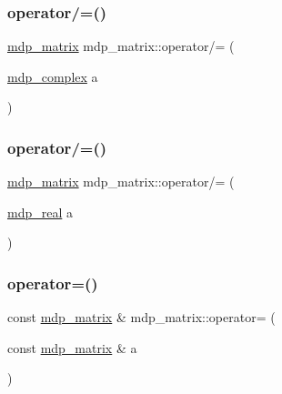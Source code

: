 \mbox{\label{classmdp__matrix_aab26bb8bce6bb9f9207e2776297c1f8d}} 
\subsubsection{\texorpdfstring{operator/=()}{operator/=()}\hspace{0.1cm}{\footnotesize\ttfamily [2/3]}}
{\footnotesize\ttfamily \hyperlink{classmdp__matrix}{mdp\+\_\+matrix} mdp\+\_\+matrix\+::operator/= (\begin{DoxyParamCaption}\item[{\hyperlink{classmdp__complex}{mdp\+\_\+complex}}]{a }\end{DoxyParamCaption})\hspace{0.3cm}{\ttfamily [inline]}}

\mbox{\label{classmdp__matrix_abc83a95f12ed5f697213cf9d812a99cd}} 
\subsubsection{\texorpdfstring{operator/=()}{operator/=()}\hspace{0.1cm}{\footnotesize\ttfamily [3/3]}}
{\footnotesize\ttfamily \hyperlink{classmdp__matrix}{mdp\+\_\+matrix} mdp\+\_\+matrix\+::operator/= (\begin{DoxyParamCaption}\item[{\hyperlink{mdp__global__vars_8h_a69d96b74c791e0bbdb888b3913a69450}{mdp\+\_\+real}}]{a }\end{DoxyParamCaption})\hspace{0.3cm}{\ttfamily [inline]}}

\mbox{\label{classmdp__matrix_a5746a4a6feeaca44c8c9a02bd21e9d57}} 
\subsubsection{\texorpdfstring{operator=()}{operator=()}\hspace{0.1cm}{\footnotesize\ttfamily [1/3]}}
{\footnotesize\ttfamily const \hyperlink{classmdp__matrix}{mdp\+\_\+matrix} \& mdp\+\_\+matrix\+::operator= (\begin{DoxyParamCaption}\item[{const \hyperlink{classmdp__matrix}{mdp\+\_\+matrix} \&}]{a }\end{DoxyParamCaption})\hspace{0.3cm}{\ttfamily [inline]}}

